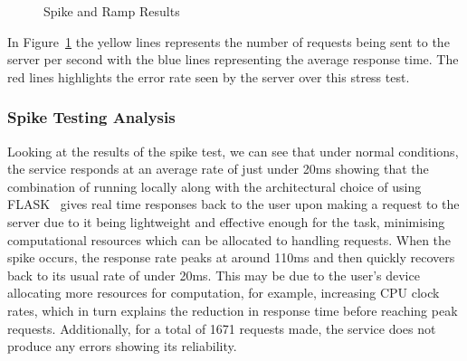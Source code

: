 \documentclass{surreydissertation}
\begin{document}
\begin{figure}[H]
    \centering
    \caption{Spike and Ramp Results}
    \label{fig:results}
    \end{figure}

In Figure~\ref{fig:results} the yellow lines represents the number of requests being sent to the server per second with the blue lines representing the average response time. The red lines highlights the error rate seen by the server over this stress test.

\subsubsection{Spike Testing Analysis}
Looking at the results of the spike test, we can see that under normal conditions, the service responds at an average rate of just under 20ms showing that the combination of running locally along with the architectural choice of using FLASK~\cite{flask} gives real time responses back to the user upon making a request to the server due to it being lightweight and effective enough for the task, minimising computational resources which can be allocated to handling requests. When the spike occurs, the response rate peaks at around 110ms and then quickly recovers back to its usual rate of under 20ms. This may be due to the user’s device allocating more resources for computation, for example, increasing CPU clock rates, which in turn explains the reduction in response time before reaching peak requests. Additionally, for a total of 1671 requests made, the service does not produce any errors showing its reliability.
\end{document}
